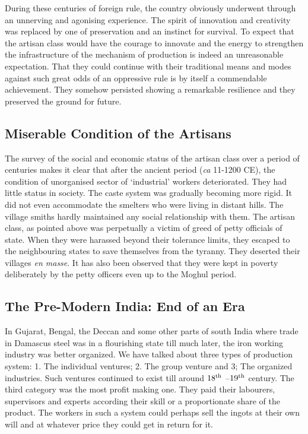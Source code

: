 During these centuries of foreign rule, the country obviously underwent through an unnerving and agonising experience. The spirit of innovation and creativity was replaced by one of preservation and an instinct for survival. To expect that the artisan class would have the courage to innovate and the energy to strengthen the infrastructure of the mechanism of production is indeed an unreasonable expectation. That they could continue with their traditional means and modes against such great odds of an oppressive rule is by itself a commendable achievement. They somehow persisted showing a remarkable resilience and they preserved the ground for future.  

\vspace{-.3cm}

\subsection*{Miserable Condition of the Artisans}\label{chapter8-subsection-4}

\vspace{-.2cm}

The survey of the social and economic status of the artisan class over a period of centuries makes it clear that after the ancient period ({\it ca} 11-1200 CE), the condition of unorganised sector of `industrial' workers deteriorated. They had little status in society. The caste system was gradually becoming more rigid. It did not even accommodate the smelters who were living in distant hills. The village smiths hardly maintained any social relationship with them. The artisan class, as pointed above was perpetually a victim of greed of petty officials of state. When they were harassed beyond their tolerance limits, they escaped to the neighbouring states to save themselves from the tyranny. They deserted their villages {\it en masse}. It has also been observed that they were kept in poverty deliberately by the petty officers even up to the Moghul period.

\vspace{-.2cm}

\subsection*{The Pre-Modern India: End of an Era}\label{chapter8-subsection-5}

\vspace{-.1cm}

In Gujarat, Bengal, the Deccan and some other parts of south India where trade in Damascus steel was in a flourishing state till much later, the iron working industry was better organized. We have talked about three types of production system: 1. The individual ventures; 2. The group venture and 3; The organized industries. Such ventures continued to exist till around $18^{\rm th}$ –$19^{\rm th}$ century. The third category was the most profit making one. They paid their labourers, supervisors and experts according their skill or a proportionate share of the product. The workers in such a system could perhaps sell the ingots at their own will and at whatever price they could get in return for it. 


